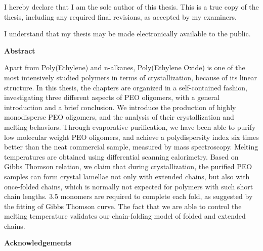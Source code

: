 \doublespacing

  \noindent
I hereby declare that I am the sole author of this thesis. This is a true copy of the thesis, including any required final revisions, as accepted by my examiners.

  \bigskip
  
  \noindent
I understand that my thesis may be made electronically available to the public.

\cleardoublepage


\begin{center}\textbf{Abstract}\end{center}

Apart from Poly(Ethylene) and n-alkanes, Poly(Ethylene Oxide) is one of the most intensively studied polymers in terms of crystallization, because of its linear structure. In this thesis, the chapters are organized in a self-contained fashion, investigating three different aspects of PEO oligomers, with a general introduction and a brief conclusion. We introduce the production of highly monodisperse PEO oligomers, and the analysis of their crystallization and melting behaviors. Through evaporative purification, we have been able to purify low molecular weight PEO oligomers, and achieve a polydispersity index six times better than the neat commercial sample, measured by mass spectroscopy. Melting temperatures are obtained using differential scanning calorimetry. Based on Gibbs Thomson relation, we claim that during crystallization, the purified PEO samples can form crystal lamellae not only with extended chains, but also with once-folded chains, which is normally not expected for polymers with such short chain lengths. 3.5 monomers are required to complete each fold, as suggested by the fitting of Gibbs Thomson curve. The fact that we are able to control the melting temperature validates our chain-folding model of folded and extended chains.

\cleardoublepage


\begin{center}\textbf{Acknowledgements}\end{center}


